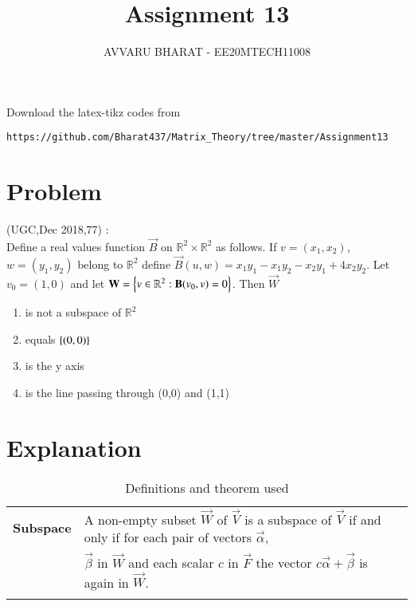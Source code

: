 \documentclass[journal,12pt]{IEEEtran}
\begin{document}
     \def\rightbox#1{\makebox[0in][r]{#1}}
     \def\centbox#1{\makebox[0in]{#1}}
     \def\topbox#1{\raisebox{-\baselineskip}[0in][0in]{#1}}
     \def\midbox#1{\raisebox{-0.5\baselineskip}[0in][0in]{#1}}
\vspace{3cm}
\title{Assignment 13}
\author{AVVARU BHARAT - EE20MTECH11008}
\maketitle
\bigskip
\renewcommand{\thefigure}{\theenumi}
\renewcommand{\thetable}{\theenumi}
%
Download the latex-tikz codes from 
%
\begin{lstlisting}
https://github.com/Bharat437/Matrix_Theory/tree/master/Assignment13
\end{lstlisting}
\section{\textbf{Problem}}
(UGC,Dec 2018,77) : \\
%
Define a real values function $\vec{B}$ on $\mathbb{R}^2\times\mathbb{R}^2$ as follows. If $v=(x_1,x_2)$, $w=(y_1,y_2)$ belong to $\mathbb{R}^2$ define $\vec{B}(u,w)=x_1y_1-x_1y_2-x_2y_1+4x_2y_2$. Let $v_0=(1,0)$ and let $\mathbf{W}=\left\{v\in\mathbb{R}^2:\mathbf{B}(v_0,v)=0\right\}$. Then $\vec{W}$
\begin{enumerate}
    \item is not a subspace of $\mathbb{R}^2$
    \item equals $\left\{(0,0)\right\}$
    \item is the y axis
    \item is the line passing through (0,0) and (1,1)
\end{enumerate}
\section{\textbf{Explanation}}
\renewcommand{\thetable}{1}
\begin{longtable}{|l|l|}
\hline
\endhead
\textbf{Subspace}&A non-empty subset $\vec{W}$ of $\vec{V}$ is a subspace of $\vec{V}$ if and only if for each pair of vectors $\vec{\alpha}$,\\& $\vec{\beta}$ in $\vec{W}$ and each scalar $c$ in $\vec{F}$ the vector $c\vec{\alpha}+\vec{\beta}$ is again in $\vec{W}$.\\
\hline
\caption{Definitions and theorem used}
\label{deftab}
\end{longtable}
\end{document}
